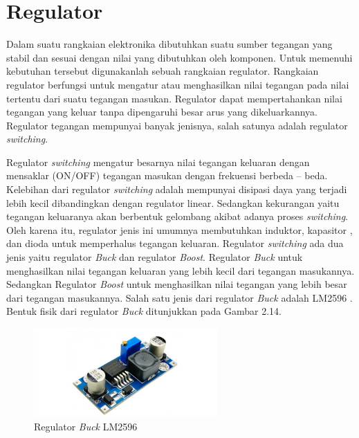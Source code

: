\section{Regulator}
Dalam suatu rangkaian elektronika dibutuhkan suatu sumber tegangan yang stabil dan sesuai dengan nilai yang dibutuhkan oleh komponen. Untuk memenuhi kebutuhan tersebut digunakanlah sebuah rangkaian regulator. Rangkaian regulator berfungsi untuk mengatur atau menghasilkan nilai tegangan pada nilai tertentu dari suatu tegangan masukan. Regulator dapat mempertahankan nilai tegangan yang keluar tanpa dipengaruhi besar arus yang dikeluarkannya. Regulator tegangan mempunyai banyak jenisnya, salah satunya adalah regulator \textit{switching}.

Regulator \textit{switching} mengatur besarnya nilai tegangan keluaran dengan mensaklar (ON/OFF) tegangan masukan dengan frekuensi berbeda – beda. Kelebihan dari regulator \textit{switching} adalah mempunyai disipasi daya yang terjadi lebih kecil dibandingkan dengan regulator linear. Sedangkan kekurangan yaitu tegangan keluaranya akan berbentuk gelombang akibat adanya proses \textit{switching}. Oleh karena itu, regulator jenis ini umumnya membutuhkan induktor, kapasitor , dan dioda untuk memperhalus tegangan keluaran. Regulator \textit{switching} ada dua jenis yaitu regulator \textit{Buck} dan regulator \textit{Boost}. Regulator \textit{Buck} untuk menghasilkan nilai tegangan keluaran yang lebih kecil dari tegangan masukannya. Sedangkan Regulator \textit{Boost} untuk menghasilkan nilai tegangan yang lebih besar dari tegangan masukannya. Salah satu jenis dari regulator \textit{Buck} adalah LM2596 . Bentuk fisik dari regulator \textit{Buck} ditunjukkan pada Gambar 2.14.

	\begin{figure}[H]
	\centering
	\includegraphics[width=7cm]{gambar/lm2596.jpg}
	\caption{Regulator \textit{Buck} LM2596}
\end{figure}

